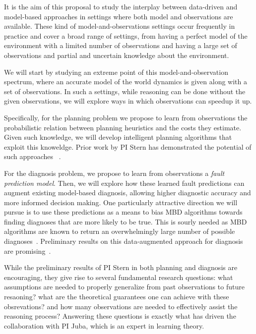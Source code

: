 \documentclass[12pt]{article}
\begin{document}
It is the aim of this proposal to study the interplay between data-driven and model-based approaches in settings where both model and observations are available. 
These kind of model-and-observations settings occur frequently in practice and cover a broad range of settings, 
from having a perfect model of the environment with a limited  number of observations and having a large set of observations and partial and uncertain knowledge about the environment. 

We will start by studying an extreme point of this model-and-observation spectrum, where an accurate model of the world dynamics is given along with a set of observations. 
In such a settings, while reasoning can be done without the given observations, we will explore ways in which observations can speedup it up. 

Specifically, for the planning problem we propose to learn from observations the probabilistic relation between planning heuristics and the costs they estimate. Given such knowledge, we will develop intelligent planning algorithms that exploit this knoweldge. Prior work by PI Stern has demonstrated the potential of such approaches~
\cite{stern2011probably,stern2012exploring,stern2014potential}. 

For the diagnosis problem, we propose to learn from observations 
a {\em fault prediction model}. Then, we will explore how these learned fault predictions can augment existing model-based diagnosis, allowing higher diagnostic accuracy and more informed decision making. One particularly attractive direction we will pursue is to use these predictions as a means to bias MBD algorithms towards finding diagnoses that are more likely to be true. This is sourly needed as MBD algorithms are known to return an overwhelmingly large number of possible diagnoses~\cite{stern2015many}. Preliminary results on this data-augmented approach for diagnosis are promising~\cite{elmishali2016dataAugmented}. 

While the preliminary results of PI Stern in both planning and diagnosis are encouraging, they give rise to several fundamental research questions: what assumptions are needed to properly generalize from past observations to future resaoning? what are the theoretical guarantees one can achieve with these obsrevations? and how many observations are needed to effectively assist the reasoning process? Answering these questions is exactly what has driven the collaboration with PI Juba, which is an expert in learning theory. 
\end{document}
